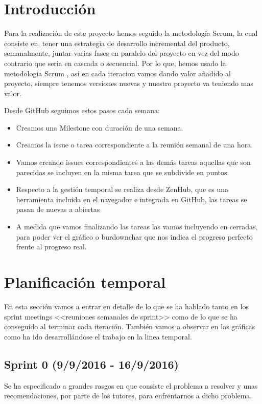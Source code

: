 
\section{Introducción}
Para la realización de este proyecto hemos seguido la metodología Scrum, la cual consiste en, tener una estrategia de desarrollo incremental del producto, semanalmente, juntar varias fases en paralelo del proyecto en vez del modo contrario que seria en cascada o secuencial. Por lo que, hemos usado la metodologia Scrum \cite{Scrum}, así en cada iteracion  vamos dando valor añadido al proyecto, siempre tenemos versiones nuevas y nuestro proyecto va teniendo mas valor.

Desde GitHub seguimos estos pasos cada semana:
\begin{itemize}
\item Creamos una Milestone con duración de una semana.
\item Creamos la issue o tarea correspondiente a la reunión semanal de una hora.
\item Vamos creando issues correspondientes a las demás tareas aquellas que son parecidas se incluyen en la misma tarea que se subdivide en puntos.
\item Respecto a la gestión temporal se realiza desde ZenHub, que es una herramienta incluida en el navegador e integrada en GitHub, las tareas se pasan de nuevas a abiertas
\item A medida que vamos finalizando las tareas las vamos incluyendo en cerradas, para poder ver el gráfico o burdownchar que nos indica el progreso perfecto frente al progreso real.

\end{itemize}


\section{Planificación temporal}
En esta sección vamos a entrar en detalle de lo que se ha hablado tanto en los sprint meetings <<reuniones semanales de sprint>> como de lo que se ha conseguido al terminar cada iteración. También vamos a observar en las gráficas como ha ido desarrollándose el trabajo en la linea temporal.

\subsection{Sprint 0 (9/9/2016 - 16/9/2016)}
Se ha especificado a grandes rasgos en que consiste el problema a resolver y unas recomendaciones, por parte de los tutores, para enfrentarnos a dicho problema.

